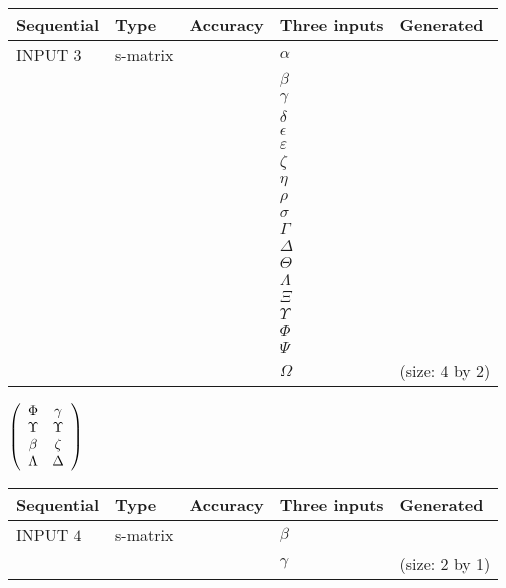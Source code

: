 \documentclass[12pt]{article}
\begin{document}
  
\noindent\begin{tabular}{|l|l|l|l|l|}
\hline
 Sequential & Type & Accuracy & Three inputs & Generated \\ 
\hline
 
 
  INPUT $           3$ & s-matrix & & 
 $  \alpha $ & 
  \\
  & & & 
 $  \beta $ & 
  \\
  & & & 
 $  \gamma $ & 
  \\
  & & & 
 $  \delta $ & 
  \\
  & & & 
 $  \epsilon $ & 
  \\
  & & & 
 $  \varepsilon $ & 
  \\
  & & & 
 $                     \zeta $ & 
  \\
  & & & 
 $  \eta $ & 
  \\
  & & & 
 $  \rho $ & 
  \\
  & & & 
 $  \sigma $ & 
  \\
  & & & 
 $  \Gamma $ & 
  \\
  & & & 
 $  \Delta $ & 
  \\
  & & & 
 $  \Theta $ & 
  \\
  & & & 
 $  \Lambda $ & 
  \\
  & & & 
 $                     \Xi $ & 
  \\
  & & & 
 $  \Upsilon $ & 
  \\
  & & & 
 $  \Phi $ & 
  \\
  & & & 
 $  \Psi $ & 
  \\
  & & & 
 $  \Omega $ & 
  (size:           4 by           2)
 \\  \hline  
 \end{tabular}
   
   
 $  \left( \begin{array}
 {
 c
 c
 }
 \Phi & 
 \gamma \\ 
 \Upsilon & 
 \Upsilon \\ 
 \beta & 
                    \zeta \\ 
 \Lambda & 
 \Delta
 \end{array} \right) $ 
  
  
\noindent\begin{tabular}{|l|l|l|l|l|}
\hline
 Sequential & Type & Accuracy & Three inputs & Generated \\ 
\hline
 
 
  INPUT $           4$ & s-matrix & & 
 $  \beta $ & 
  \\
  & & & 
 $  \gamma $ & 
  (size:           2 by           1)
 \\  \hline  
 \end{tabular}
   
\end{document}
